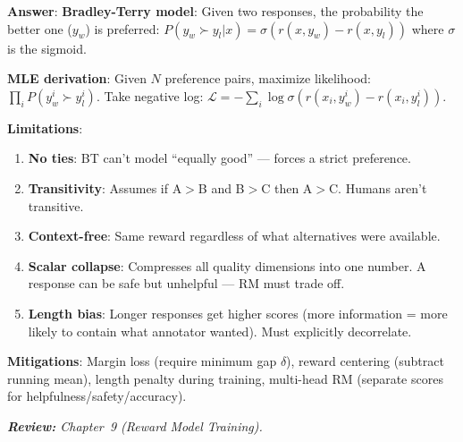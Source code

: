 \begin{questionbox}
\textbf{Answer}: \textbf{Bradley-Terry model}: Given two responses, the probability the better one ($y_w$) is preferred: $P(y_w \succ y_l | x) = \sigma(r(x, y_w) - r(x, y_l))$ where $\sigma$ is the sigmoid.

\textbf{MLE derivation}: Given $N$ preference pairs, maximize likelihood: $\prod_i P(y_w^i \succ y_l^i)$. Take negative log: $\mathcal{L} = -\sum_i \log\sigma(r(x_i, y_w^i) - r(x_i, y_l^i))$.

\textbf{Limitations}:

\begin{enumerate}
  \item \textbf{No ties}: BT can’t model ``equally good'' --- forces a strict preference.
  \item \textbf{Transitivity}: Assumes if A$>$B and B$>$C then A$>$C. Humans aren’t transitive.
  \item \textbf{Context-free}: Same reward regardless of what alternatives were available.
  \item \textbf{Scalar collapse}: Compresses all quality dimensions into one number. A response can be safe but unhelpful --- RM must trade off.
  \item \textbf{Length bias}: Longer responses get higher scores (more information = more likely to contain what annotator wanted). Must explicitly decorrelate.
\end{enumerate}

\textbf{Mitigations}: Margin loss (require minimum gap $\delta$), reward centering (subtract running mean), length penalty during training, multi-head RM (separate scores for helpfulness/safety/accuracy).

\emph{\textbf{Review:} Chapter~9 (Reward Model Training).}
\end{questionbox}

